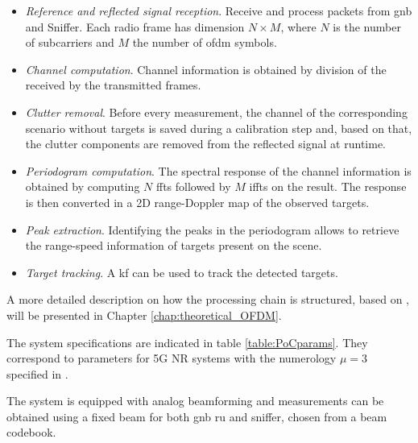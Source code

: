 	\begin{itemize}
		\item \textit{Reference and reflected signal reception}. Receive and process packets from \gls{gnb} and Sniffer. Each radio frame has dimension $N\times M$, where $N$ is the number of subcarriers and $M$ the number of \gls{ofdm} symbols.
		\item \textit{Channel computation}. Channel information is obtained by division of the received by the transmitted frames.
		\item \textit{Clutter removal}. Before every measurement, the channel of the corresponding scenario without targets is saved during a calibration step and, based on that, the clutter components are removed from the reflected signal at runtime.
		\item \textit{Periodogram computation}. The spectral response of the channel information is obtained by computing $N$ \glspl{fft} followed by $M$ \glspl{ifft} on the result. The response is then converted in a 2D range-Doppler map of the observed targets. 
		\item \textit{Peak extraction}. Identifying the peaks in the periodogram allows to retrieve the range-speed information of targets present on the scene.
		\item \textit{Target tracking}. A \gls{kf} can be used to track the detected targets. 
	\end{itemize} 
	A more detailed description on how the processing chain is structured,  based on \cite{Braun2014OFDMRA}, will be presented in Chapter \ref{chap:theoretical_OFDM}.
	
	
	The system specifications are indicated in table \ref{table:PoCparams}.
	They correspond to parameters for 5G \gls{NR} systems with the numerology $\mu=3$ specified in \cite{TS138211}. 
	
	The system is equipped with analog beamforming and measurements can be obtained using a fixed beam for both \gls{gnb} \gls{ru} and sniffer, chosen from a beam codebook.
	
